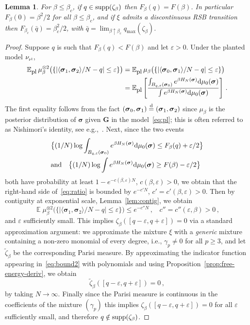\documentclass[11pt]{article}
\newtheorem{lemma}[theorem]{Lemma}
\theoremstyle{definition}
\numberwithin{equation}{section}
\newcommand{\<}{\langle}
\renewcommand{\>}{\rangle}
\def\bsigma{{\boldsymbol{\sigma}}}
\def\bbE{{\mathbb{E}}}
\def\pl{\mbox{\rm\tiny pl}}
\def\plsmall{\mbox{\rm\small pl}}
\def\de{{\rm d}}
\def\bG{{\boldsymbol G}}
\DeclareMathOperator*{\E}{\bbE}
\def\supp{{\rm supp}}
\def\eps{\varepsilon}
\begin{document}
\begin{lemma}\label{lem:discont_FP}
For $\beta \le \beta_c$, if $q \in \supp(\zeta_\beta)$ then $F_{\beta}(q) = F(\beta)$. In particular $F_{\beta}(0) = \beta^2/2$ for all $\beta \le \beta_c$, and if $\xi$ admits a discontinuous RSB transition then $F_{\beta_c}(\bar{q}) =  \beta_c^2/2$, with $\bar{q} = \lim_{\beta\uparrow \beta_c}
    q_{\max}(\zeta_{\beta})$.
 \end{lemma}

\begin{proof}
Suppose $q$ is such that $F_{\beta}(q) < F(\beta)$ and let $\eps>0$. Under the planted model $\nu_{\pl}$,
\begin{align}
\bbE_{\plsmall} \,\mu_{\beta}^{\otimes 2} \big(\{|\langle \bsigma_1, \bsigma_2\rangle/N - q| \le \eps \}\big) &= \bbE_{\plsmall} \,\mu_{\beta} \big(\{|\langle \bsigma_0, \bsigma_1\rangle/N - q| \le \eps \}\big) \nonumber\\
&= \bbE_{\plsmall}\left[\frac{\int_{B_{q,\eps}(\bsigma_0)} e^{\beta H_N(\bsigma)} \de \mu_0(\bsigma)}{\int e^{\beta H_N(\bsigma)} \de \mu_0(\bsigma)}\right]\,.\label{eq:ratio}
\end{align}
The first equality follows from the fact $(\bsigma_0,\bsigma_1) \stackrel{\de}{=} (\bsigma_1,\bsigma_2)$ since $\mu_\beta$ is the posterior distribution of $\bsigma$ given $\bG$ in the model~\eqref{eq:pl}; this is often referred to as Nishimori's identity, see e.g.,~\cite{lelarge2016fundamental}.   
%
Next, since the two events 
\begin{align*}
    &\big\{(1/N)\log \int_{B_{q,\eps}(\bsigma_0)} e^{\beta H_N(\bsigma)} \de \mu_0(\bsigma) \le F_{\beta}(q) + \eps/2\big\}\\
    &\mbox{and}~~~
\big\{(1/N)\log \int e^{\beta H_N(\bsigma)} \de \mu_0(\bsigma) \ge F(\beta) - \eps/2\big\}
\end{align*}
both have probability at least $1-e^{-c(\beta,\eps)N}$, 
$c(\beta,\eps)>0$, we obtain that the right-hand side of~\eqref{eq:ratio} is bounded by $e^{-c'N}$, $c'=c'(\beta,\eps)>0$. 
Then by contiguity at exponential scale, Lemma~\ref{lem:contig}, we obtain
\begin{equation}\label{eq:bound2}
\E \mu_{\beta}^{\otimes 2} \big(\{|\langle \bsigma_1, \bsigma_2\rangle/N - q| \le \eps \}\big) \le e^{-c''N}\,,~~~~c'' = c''(\eps,\beta)>0\,,
\end{equation}
and $\eps$ sufficiently small.
This implies $\zeta_{\beta}([q-\eps,q+\eps]) = 0$ via a standard approximation argument: we approximate the mixture $\xi$ with a \emph{generic} mixture containing a non-zero monomial of every degree, i.e., $\gamma_p \neq 0$ for all $p \ge 3$, and let $\tilde{\zeta}_{\beta}$ be the corresponding Parisi measure.     
By approximating the indicator function appearing in~\eqref{eq:bound2} with polynomials and using Proposition~\ref{prop:free-energy-deriv}, we obtain  
\[\tilde{\zeta}_{\beta}([q-\eps,q+\eps]) = 0\,,\]
by taking $N\to \infty$. Finally since the Parisi measure is continuous in the coefficients of the mixture $(\gamma_p)$ this implies $\zeta_{\beta}([q-\eps,q+\eps]) = 0$ for all $\eps$ sufficiently small, and therefore $q \notin \supp(\zeta_{\beta})$. 
\end{proof}
\end{document}
